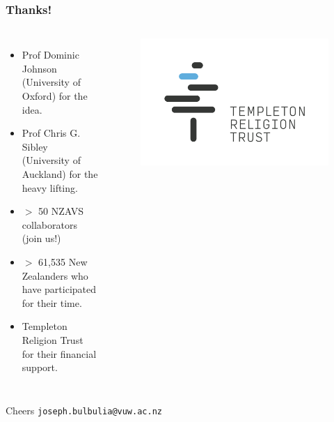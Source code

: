 \documentclass{beamer}
\begin{document}
\begin{frame}
\frametitle{Thanks!}

\begin{columns}

\begin{itemize}
\item Prof Dominic Johnson (University of Oxford) for the idea.
\item Prof Chris G. Sibley (University of Auckland) for the heavy lifting.
\item $>$ 50 NZAVS collaborators (join us!)
\item $>$ 61,535 New Zealanders who have participated for their time.
\item Templeton Religion Trust for their financial support.
\end{itemize}

\centering
\begin{figure}
\includegraphics[width=\textwidth,height=\textheight,keepaspectratio]{TRT_LOGO.png}
\end{figure}
\end{columns}
\end{frame}


\begin{frame}{Cheers}
\centering
\texttt{joseph.bulbulia@vuw.ac.nz}
\end{frame}


\end{document}
